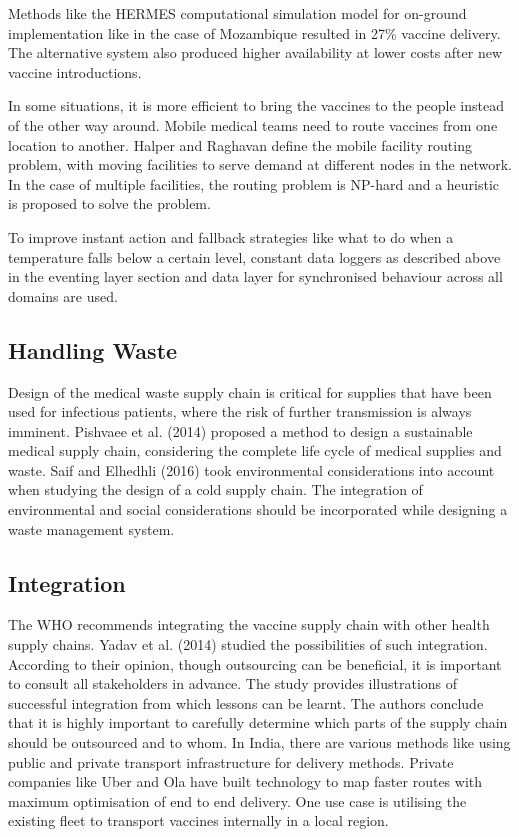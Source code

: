 \documentclass{article}
\begin{document}
 Methods like the HERMES computational simulation model for on-ground implementation like in the case of Mozambique resulted in 27\% vaccine delivery. The alternative system also produced higher availability at lower costs after new vaccine introductions.\cite{LEE20164998}
 
 In some situations, it is more efficient to bring the vaccines to the people instead of the other way around. Mobile medical teams need to route vaccines from one location to another. Halper and Raghavan define the mobile facility routing problem, with moving facilities to serve demand at different nodes in the network. In the case of multiple facilities, the routing problem is NP-hard and a heuristic is proposed to solve the problem.\cite{duijzer2018literature}
 
 To improve instant action and fallback strategies like what to do when a temperature falls below a certain level, constant data loggers as described above in the eventing layer section and data layer for synchronised behaviour across all domains are used.
 
 \subsection{Handling Waste}
 
Design of the medical waste supply chain is critical for supplies that have been used for infectious patients, where the risk of further transmission is always imminent. Pishvaee et al. (2014) proposed a method to design a sustainable medical supply chain, considering the complete life cycle of medical supplies and waste. Saif and Elhedhli (2016) took environmental considerations into account when studying the design of a cold supply chain. \cite{duijzer2018literature} The integration of environmental and social considerations should be incorporated while designing a waste management system.
 
 \subsection{Integration}
 The WHO recommends integrating the vaccine supply chain with other health supply chains. Yadav et al. (2014) studied the possibilities of such integration. According to their opinion, though outsourcing can be beneficial, it is important to consult all stakeholders in advance. The study provides illustrations of successful integration from which lessons can be learnt. The authors conclude that it is highly important to carefully determine which parts of the supply chain should be outsourced and to whom.\cite{duijzer2018literature}
 In India, there are various methods like using public and private transport infrastructure for delivery methods. Private companies like Uber and Ola have built technology to map faster routes with maximum optimisation of end to end delivery. One use case is utilising the existing fleet to transport vaccines internally in a local region.
\end{document}
